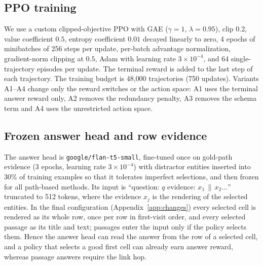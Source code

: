 \subsection{PPO training}
We use a custom clipped-objective PPO with GAE ($\gamma=1$, $\lambda=0.95$), clip $0.2$, value coefficient $0.5$, entropy coefficient $0.01$ decayed linearly to zero, 4 epochs of minibatches of 256 steps per update, per-batch advantage normalization, gradient-norm clipping at $0.5$, Adam with learning rate $3\times10^{-4}$, and 64 single-trajectory episodes per update.
The terminal reward is added to the last step of each trajectory.
The training budget is 48{,}000 trajectories (750 updates).
Variants A1--A4 change only the reward switches or the action space: A1 uses the terminal answer reward only, A2 removes the redundancy penalty, A3 removes the schema term and A4 uses the unrestricted action space.

\subsection{Frozen answer head and row evidence}
The answer head is \texttt{google/flan-t5-small}, fine-tuned once on gold-path evidence (3 epochs, learning rate $3\times10^{-4}$) with distractor entities inserted into 30\% of training examples so that it tolerates imperfect selections, and then frozen for all path-based methods.
Its input is ``question: $q$ evidence: $x_1\,\|\,x_2\dots$'' truncated to 512 tokens, where the evidence $x_j$ is the rendering of the selected entities.
In the final configuration (Appendix~\ref{app:changes}) every selected cell is rendered as its whole row, once per row in first-visit order, and every selected passage as its title and text; passages enter the input only if the policy selects them.
Hence the answer head can read the answer from the row of a selected cell, and a policy that selects a good first cell can already earn answer reward, whereas passage answers require the link hop.
